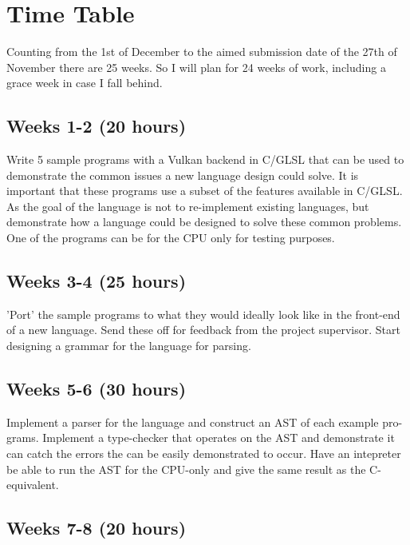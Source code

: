\documentclass[11pt]{article}
\begin{document}



\newpage
\appendix

\section{Time Table}

Counting from the 1st of December to the aimed submission date of the 27th of
November there are 25 weeks. So I will plan for 24 weeks of work, including a
grace week in case I fall behind.

\subsection{Weeks 1-2 (20 hours)}

Write 5 sample programs with a Vulkan backend in C/GLSL that can be used to
demonstrate the common issues a new language design could solve. It is
important that these programs use a subset of the features available in C/GLSL.
As the goal of the language is not to re-implement existing languages, but
demonstrate how a language could be designed to solve these common problems.
One of the programs can be for the CPU only for testing purposes.

\subsection{Weeks 3-4 (25 hours)}

'Port' the sample programs to what they would ideally look like in the
front-end of a new language. Send these off for feedback from the project
supervisor. Start designing a grammar for the language for parsing.

\subsection{Weeks 5-6 (30 hours)}

Implement a parser for the language and construct an AST of each example pro-
grams. Implement a type-checker that operates on the AST and demonstrate it can
catch the errors the can be easily demonstrated to occur. Have an intepreter be
able to run the AST for the CPU-only and give the same result as the
C-equivalent.

\subsection{Weeks 7-8 (20 hours)}
\end{document}
